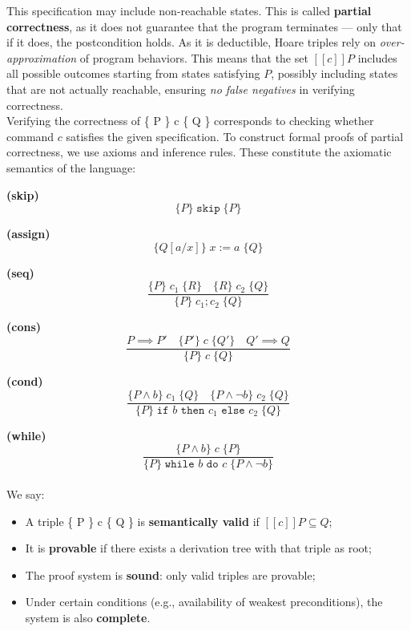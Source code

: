 \documentclass[parskip=half]{scrartcl}
\begin{document}
This specification may include non-reachable states. This is called \textbf{partial correctness}, as it does not guarantee that the program terminates — only that if it does, the postcondition holds.
As it is deductible, Hoare triples rely on \emph{over-approximation} of program behaviors. This means that the set $[[c]]P$ includes all possible outcomes starting from states satisfying $P$, possibly including states that are not actually reachable, ensuring \emph{no false negatives} in verifying correctness.
\\ Verifying the correctness of \{ P \} c \{ Q \} corresponds to checking whether command $c$ satisfies the given specification. To construct formal proofs of partial correctness, we use axioms and inference rules. These constitute the axiomatic semantics of the language:

\textbf{(skip)} 
\[
\{P\} \;\texttt{skip}\; \{P\}
\]

\textbf{(assign)} 
\[
\{Q[a/x]\} \; x := a \; \{Q\}
\]

\textbf{(seq)} 
\[
\frac{\{P\} \; c_1 \; \{R\} \quad \{R\} \; c_2 \; \{Q\}}{\{P\} \; c_1; c_2 \; \{Q\}}
\]

\textbf{(cons)} 
\[
\frac{P \implies P' \quad \{P'\} \; c \; \{Q'\} \quad Q' \implies Q}{\{P\} \; c \; \{Q\}}
\]

\textbf{(cond)} 
\[
\frac{\{P \wedge b\} \; c_1 \; \{Q\} \quad \{P \wedge \neg b\} \; c_2 \; \{Q\}}{\{P\} \; \texttt{if } b \texttt{ then } c_1 \texttt{ else } c_2 \; \{Q\}}
\]

\textbf{(while)} 
\[
\frac{\{P \wedge b\} \; c \; \{P\}}{\{P\} \; \texttt{while } b \texttt{ do } c \; \{P \wedge \neg b\}}
\]
\\ We say:
\begin{itemize}
\item A triple \{ P \} c \{ Q \} is \textbf{semantically valid} if $[[c]]P \subseteq Q$;
\item It is \textbf{provable} if there exists a derivation tree with that triple as root;
\item The proof system is \textbf{sound}: only valid triples are provable;
\item Under certain conditions (e.g., availability of weakest preconditions), the system is also \textbf{complete}.
\end{itemize}
\end{document}

